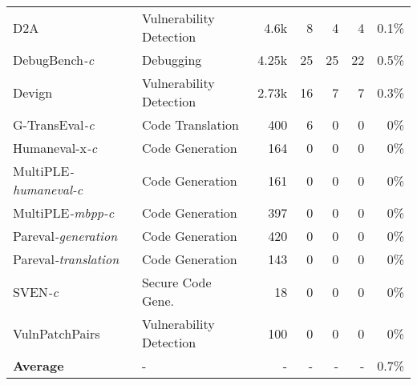 \begin{table}[t]
{{\begin{tabular}{llrrrrr}
D2A~\cite{D2A} & Vulnerability Detection & 4.6k & 8 & 4 & 4 & \cellcolor{red!0.2} 0.1\% \\
DebugBench\textit{-c}~\cite{DebugBench} & Debugging & 4.25k & 25 & 25 & 22 & \cellcolor{red!1} 0.5\% \\
Devign~\cite{Devign} & Vulnerability Detection & 2.73k & 16 & 7 & 7 & \cellcolor{red!0.6} 0.3\% \\
G-TransEval\textit{-c}~\cite{G-TransEval} & Code Translation & 400 & 6 & 0 & 0 & 0\% \\
Humaneval-x\textit{-c}~\cite{zheng2023codegeex} & Code Generation & 164 & 0 & 0 & 0 & 0\% \\
MultiPLE\textit{-humaneval-c}~\cite{MultiPLE} & Code Generation & 161 & 0 & 0 & 0 & 0\% \\
MultiPLE\textit{-mbpp-c}~\cite{MultiPLE} & Code Generation & 397 & 0 & 0 & 0 & 0\% \\
Pareval\textit{-generation}~\cite{Pareval} & Code Generation & 420 & 0 & 0 & 0 & 0\% \\
Pareval\textit{-translation}~\cite{Pareval} & Code Generation & 143 & 0 & 0 & 0 & 0\% \\
SVEN\textit{-c}~\cite{SVEN} & Secure Code Gene. & 18 & 0 & 0 & 0 & 0\% \\
VulnPatchPairs~\cite{VulnPatchPairs} & Vulnerability Detection & 100 & 0 & 0 & 0 & 0\% \\ \hline
\textbf{Average} & - & - & - & - & - & 0.7\% \\
\bottomrule
\end{tabular}
}} \vspace{-0.4cm}
\end{table}
